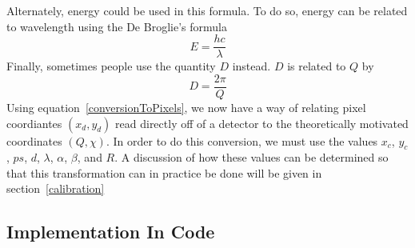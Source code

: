 Alternately, energy could be used in this formula.
To do so, energy can be related to wavelength using
the De Broglie's formula
\begin{equation}
E = \frac{hc}{\lambda}
\end{equation}
Finally, sometimes people use the quantity $D$ instead.
$D$ is related to $Q$ by
\begin{equation}
    D = \frac{2\pi}{Q}
\end{equation}
Using equation~\ref{conversionToPixels},
we now have a way of relating pixel
coordiantes $(x_d,y_d)$ read directly off
of a detector to the
theoretically motivated coordinates $(Q,\chi)$.
In order to do this conversion, we must use
the values $x_c$, $y_c$, $ps$, $d$, $\lambda$,
$\alpha$, $\beta$, and $R$. A discussion of
how these values can be determined so that
this transformation can in practice be done
will be given in section~\ref{calibration}


\subsection{Implementation In Code}

